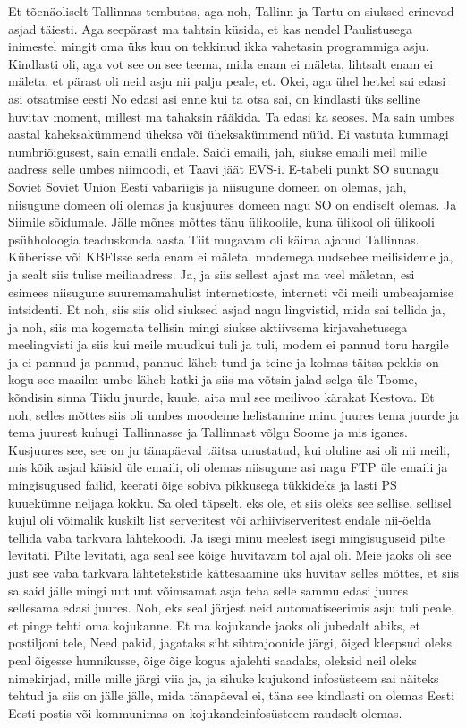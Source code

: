 Et tõenäoliselt Tallinnas tembutas, aga noh, Tallinn ja Tartu on siuksed erinevad asjad täiesti.
Aga seepärast ma tahtsin küsida, et kas nendel Paulistusega inimestel mingit oma üks kuu on tekkinud ikka vahetasin programmiga asju.
Kindlasti oli, aga vot see on see teema, mida enam ei mäleta, lihtsalt enam ei mäleta, et pärast oli neid asju nii palju peale, et.
Okei, aga ühel hetkel sai edasi asi otsatmise eesti
No edasi asi enne kui ta otsa sai, on kindlasti üks selline huvitav moment, millest ma tahaksin rääkida. Ta edasi ka seoses. Ma sain umbes aastal kaheksakümmend üheksa või üheksakümmend nüüd.
Ei vastuta kummagi numbriõigusest, sain emaili endale. Saidi emaili, jah, siukse emaili meil mille aadress selle umbes niimoodi, et Taavi jäät EVS-i.
E-tabeli punkt SO suunagu Soviet Soviet Union Eesti vabariigis ja niisugune domeen on olemas, jah, niisugune domeen oli olemas ja kusjuures domeen nagu SO on endiselt olemas.
Ja Siimile sõidumale. Jälle mõnes mõttes tänu ülikoolile, kuna ülikool oli ülikooli psühholoogia teaduskonda aasta Tiit mugavam oli käima ajanud Tallinnas.
Küberisse või KBFIsse seda enam ei mäleta, modemega uudsebee meilisideme ja, ja sealt siis tulise meiliaadress. Ja, ja siis sellest ajast ma veel mäletan, esi esimees niisugune suuremamahulist internetioste, interneti või meili umbeajamise intsidenti. Et noh, siis siis olid siuksed asjad nagu lingvistid, mida sai tellida ja, ja noh, siis ma kogemata tellisin mingi siukse aktiivsema kirjavahetusega meelingvisti ja siis kui meile muudkui tuli ja tuli, modem ei pannud toru hargile ja ei pannud ja pannud, pannud läheb tund ja teine ja kolmas täitsa pekkis on kogu see maailm umbe läheb katki ja siis ma võtsin jalad selga üle Toome, kõndisin sinna Tiidu juurde, kuule, aita mul see meilivoo kärakat Kestova. Et noh, selles mõttes siis oli umbes moodeme helistamine minu juures tema juurde ja tema juurest kuhugi Tallinnasse ja Tallinnast võlgu Soome ja mis iganes.
Kusjuures see, see on ju tänapäeval täitsa unustatud, kui oluline asi oli nii meili, mis kõik asjad käisid üle emaili, oli olemas niisugune asi nagu FTP üle emaili ja mingisugused failid, keerati õige sobiva pikkusega tükkideks ja lasti PS kuuekümne neljaga kokku.
Sa oled täpselt, eks ole, et siis oleks see sellise, sellisel kujul oli võimalik kuskilt list serveritest või arhiiviserveritest endale nii-öelda tellida vaba tarkvara lähtekoodi.
Ja isegi minu meelest isegi mingisuguseid pilte levitati.
Pilte levitati, aga seal see kõige huvitavam tol ajal oli. Meie jaoks oli see just see vaba tarkvara lähtetekstide kättesaamine üks huvitav selles mõttes, et siis sa said jälle mingi uut uut võimsamat asja teha selle sammu edasi juures sellesama edasi juures. Noh, eks seal järjest neid automatiseerimis asju tuli peale, et pinge tehti oma kojukanne. Et ma kojukande jaoks oli jubedalt abiks, et postiljoni tele, Need pakid, jagataks siht sihtrajoonide järgi, õiged kleepsud oleks peal õigesse hunnikusse, õige õige kogus ajalehti saadaks, oleksid neil oleks nimekirjad, mille mille järgi viia ja, ja sihuke kujukond infosüsteem sai näiteks tehtud ja siis on jälle jälle, mida tänapäeval ei, täna see kindlasti on olemas Eesti Eesti postis või kommunimas on kojukandeinfosüsteem raudselt olemas.
